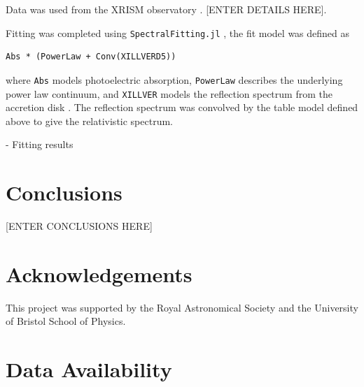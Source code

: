 \documentclass[fleqn,usenatbib]{mnras}
\begin{document}
Data was used from the XRISM observatory \cite{xrism_science_team_science_2020}. [ENTER DETAILS HERE].

Fitting was completed using \verb|SpectralFitting.jl|  \cite{baker_spectralfittingjl_2025}, the fit model was defined as
\begin{verbatim}
Abs * (PowerLaw + Conv(XILLVERD5))
\end{verbatim}
where \verb|Abs| models photoelectric absorption, \verb|PowerLaw| describes the underlying power law continuum, and \verb|XILLVER| models the reflection spectrum from the accretion disk \cite{garcia_x-ray_2010,garcia_x-ray_2013,garcia_improved_2014}. The reflection spectrum was convolved by the table model defined above to give the relativistic spectrum.

- Fitting results

\vspace{-2em}
\section{Conclusions}
[ENTER CONCLUSIONS HERE]

\vspace{-2em}
\section*{Acknowledgements}

This project was supported by the Royal Astronomical Society and the University of Bristol School of Physics.

\vspace{-2em}
\section*{Data Availability}








\bsp	%
\label{lastpage}
\end{document}
